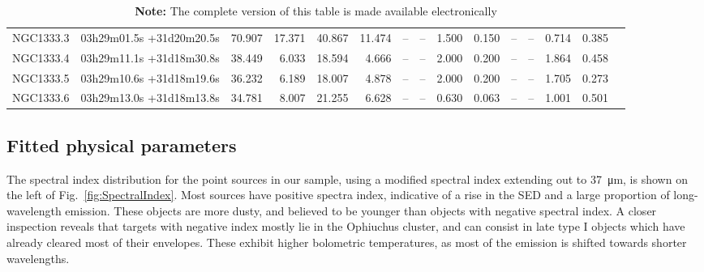 \begin{landscape}
\begin{table}[!h]
\begin{longtable}{llrrrrrrrrrrrrr}
NGC1333.3	&	03h29m01.5s	+31d20m20.5s	&	70.907	&	17.371	&	40.867	&	11.474	&	--	&	--	&	1.500	&	0.150	&	--	&	--	&	0.714	&	0.385	&		\\
NGC1333.4	&	03h29m11.1s	+31d18m30.8s	&	38.449	&	6.033	&	18.594	&	4.666	&	--	&	--	&	2.000	&	0.200	&	--	&	--	&	1.864	&	0.458	&		\\
NGC1333.5	&	03h29m10.6s	+31d18m19.6s	&	36.232	&	6.189	&	18.007	&	4.878	&	--	&	--	&	2.000	&	0.200	&	--	&	--	&	1.705	&	0.273	&		\\
NGC1333.6	&	03h29m13.0s	+31d18m13.8s	&	34.781	&	8.007	&	21.255	&	6.628	&	--	&	--	&	0.630	&	0.063	&	--	&	--	&	1.001	&	0.501	&		\\
\bottomrule																														
\end{longtable}																																	
\caption*{\textbf{Note:} The complete version of this table is made available electronically}																																				
\end{table}																														\end{landscape}


\subsection{Fitted physical parameters}

The spectral index distribution for the point sources in our sample, using a modified spectral index extending out to \SI{37}{\um}, is shown on the left of Fig.~\ref{fig:SpectralIndex}. Most sources have positive spectra index, indicative of a rise in the SED and a large proportion of long-wavelength emission. These objects are more dusty, and believed to be younger than objects with negative spectral index. A closer inspection reveals that targets with negative index mostly lie in the Ophiuchus cluster, and can consist in late type I objects which have already cleared most of their envelopes. These exhibit higher bolometric temperatures, as most of the emission is shifted towards shorter wavelengths.

